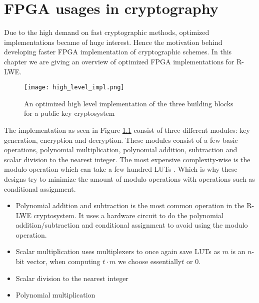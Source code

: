 \chapter{FPGA usages in cryptography\label{FPGA_crypto}}
Due to the high demand on fast cryptographic methods, optimized implementations
became of huge interest. Hence the motivation behind developing faster FPGA
implementation of cryptographic schemes. In this chapter we are giving an
overview of optimized FPGA implementations for R-LWE.

\begin{figure}[H]

    \texttt{[image: high\_level\_impl.png]}
    \caption{An optimized high level implementation of the three building
    blocks for a public key cryptosystem \citep{FPGA_Post_Quantum_Primitives}}
    \label{fig:high_level_pkc_impl}

\end{figure}

The implementation as seen in Figure \ref{fig:high_level_pkc_impl} consist of
three different modules: key generation, encryption and decryption. These
modules consist of a few basic operations, polynomial multiplication,
polynomial addition, subtraction and scalar division to the nearest integer.
The most expensive complexity-wise is the modulo operation which can take a few
hundred LUTs \citep{FPGA_Post_Quantum_Primitives}. Which is why these designs
try to minimize the amount of modulo operations with operations such as
conditional assignment.

\begin{itemize}
    \item
        Polynomial addition and subtraction is the most common operation in the
        R-LWE cryptosystem. It uses a hardware circuit to do the polynomial
        addition/subtraction and conditional assignment to avoid using the
        modulo operation.

    \item
        Scalar multiplication uses multiplexers to once again save LUTs as
        $m$ is an $n$-bit vector, when computing $t\cdot m$ we choose
        essentially$t$ or $0$.

    \item
        Scalar division to the nearest integer
    \item
        Polynomial multiplication

\end{itemize}
